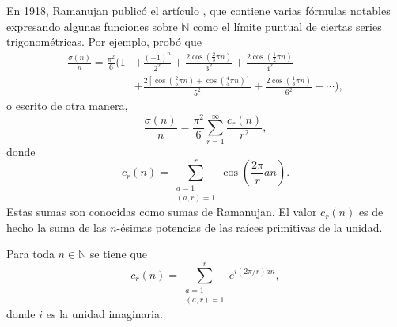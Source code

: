En 1918, Ramanujan publicó el artículo \cite{Ram1}, que contiene varias fórmulas notables expresando algunas funciones sobre $\mathbb{N}$ como el límite puntual de ciertas series trigonométricas. Por ejemplo, probó que
\begin{align*}
    \frac{\sigma(n)}{n} = \frac{\pi^2}{6} \bigg( 1 & + \frac{(-1)^n}{2^2} + \frac{2 \cos \left( \frac{2}{3} \pi n \right)}{3^2} + \frac{2 \cos \left( \frac{1}{2} \pi n \right)}{4^2} \\
                                                   & + \frac{2 \left[ \cos \left( \frac{2}{5}\pi n \right) + \cos \left( \frac{4}{5} \pi n \right) \right]}{5^2} + \frac{2 \cos \left(  \frac{1}{3} \pi n \right)}{6^2} + \cdots \bigg),
\end{align*}
o escrito de otra manera,
\begin{equation*}
    \frac{\sigma(n)}{n} = \frac{\pi^2}{6} \sum_{r=1}^{\infty} \frac{c_r(n)}{r^2},
\end{equation*}
donde
\begin{equation*}
    c_r(n) = \sum_{\substack{a=1 \\ (a,r)=1}}^{r} \cos \left( \frac{2 \pi}{r} a n \right).
\end{equation*}
Estas sumas son conocidas como \textrm{sumas de Ramanujan}. El valor $c_r(n)$ es de hecho la suma de las $n$-ésimas potencias de las raíces primitivas de la unidad.

\begin{proposition}
Para toda $n \in \mathbb{N}$ se tiene que
\begin{equation*}
    c_r(n) = \sum_{\substack{a=1 \\ (a,r)=1}}^{r} e^{i(2 \pi /r) a n},
\end{equation*}
donde $i$ es la unidad imaginaria.
\end{proposition}

